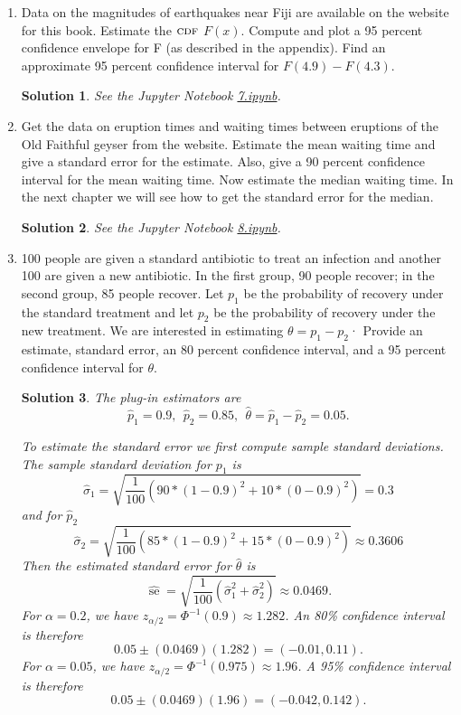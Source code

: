 \documentclass[10pt]{article}
\newtheorem*{sol}{Solution}
\newcommand{\se}{\operatorname{se}}
\newcommand{\CDF}{\textsc{cdf}}
\begin{document}
\begin{enumerate}
\item[(7)] Data on the magnitudes of earthquakes near Fiji are available on the
website for this book. Estimate the $\CDF$ $F(x)$. Compute and plot a 95
percent confidence envelope for F (as described in the appendix). Find
an approximate 95 percent confidence interval for $F(4.9) - F(4.3)$.

\begin{sol}
See the Jupyter Notebook
\href{https://github.com/ajrasmus/some_of_statistics/blob/main/chapter_7/7.ipynb}{7.ipynb}.
\end{sol}

\item[(8)] Get the data on eruption times and waiting times between eruptions of
the Old Faithful geyser from the website. Estimate the mean waiting
time and give a standard error for the estimate. Also, give a 90 percent
confidence interval for the mean waiting time. Now estimate the median
waiting time. In the next chapter we will see how to get the standard
error for the median.

\begin{sol}
See the Jupyter Notebook
\href{https://github.com/ajrasmus/some_of_statistics/blob/main/chapter_7/8.ipynb}{8.ipynb}.
\end{sol}

\item[(9)] 100 people are given a standard antibiotic to treat an infection and
another 100 are given a new antibiotic. In the first group, 90 people
recover; in the second group, 85 people recover. Let $p_1$ be the probability
of recovery under the standard treatment and let $p_2$ be the probability of
recovery under the new treatment. We are interested in estimating
$\theta=p_1-p_2$· Provide an estimate, standard error, an 80 percent confidence
interval, and a 95 percent confidence interval for $\theta$.

\begin{sol}
The plug-in estimators are
\[
\hat p_1 = 0.9, \ \ \hat p_2 = 0.85,  \ \ \hat \theta = \hat p_1-\hat p_2 = 0.05.
\]

To estimate the standard error we first compute sample standard deviations.
The sample standard deviation for $p_1$ is
\[
\hat \sigma_1 = \sqrt{\frac{1}{100} (90 * (1 - 0.9)^2 + 10 * (0 - 0.9)^2)} = 0.3
\]
and for $\hat p_2$
\[
\hat \sigma_2 = \sqrt{\frac{1}{100} (85 * (1 - 0.9)^2 + 15 * (0 - 0.9)^2)} \approx
0.3606
\]
Then the estimated standard error for $\hat \theta$ is
\[
\widehat{\se} = \sqrt{\frac{1}{100}\left(\hat \sigma_1^2 + \hat \sigma_2^2\right)}
\approx 0.0469.
\]
For $\alpha=0.2$, we have $z_{\alpha/2}=\Phi^{-1}(0.9) \approx 1.282$. An 80\%
confidence interval is therefore
\[
0.05 \pm (0.0469)(1.282) = (-0.01, 0.11).
\]
For $\alpha=0.05$, we have $z_{\alpha/2}=\Phi^{-1}(0.975) \approx 1.96$. A 95\%
confidence interval is therefore
\[
0.05 \pm (0.0469)(1.96) = (-0.042, 0.142).
\]
\end{sol}


\end{enumerate}
\end{document}
